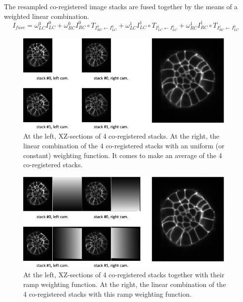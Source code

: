 The resampled co-registered image stacks are fused together by the means of a weighted linear combination.
\begin{displaymath}
I_{fuse} =
\omega^{0}_{LC} I^{0}_{LC}
+ \omega^{0}_{RC} I^{0}_{RC} \circ T_{I^{0}_{RC} \leftarrow I^{0}_{LC}}
+ \omega^{1}_{LC} I^{1}_{LC} \circ T_{I^{1}_{LC} \leftarrow I^{0}_{LC}}
+ \omega^{1}_{RC} I^{1}_{RC} \circ T_{I^{1}_{RC} \leftarrow I^{0}_{LC}}
\end{displaymath}



\begin{figure}
\begin{center}
\includegraphics[height=50mm]{figures/fusion-uniform-combination.png}
\end{center}
\caption{\label{fig:cli:fuse:uniform:combination} At the left, XZ-sections of 4 co-registered stacks. 
At the right, the linear combination of the 4 co-registered stacks with an uniform (or constant) weighting function. It comes to make an average of the 4 co-registered stacks.}
\end{figure}

\begin{figure}
\begin{center}
\includegraphics[height=50mm]{figures/fusion-ramp-combination.png}
\end{center}
\caption{\label{fig:cli:fuse:ramp:combination} At the left, XZ-sections of 4 co-registered stacks together with their ramp weighting function.
At the right, the linear combination of the 4 co-registered stacks with this ramp weighting function.}
\end{figure}

